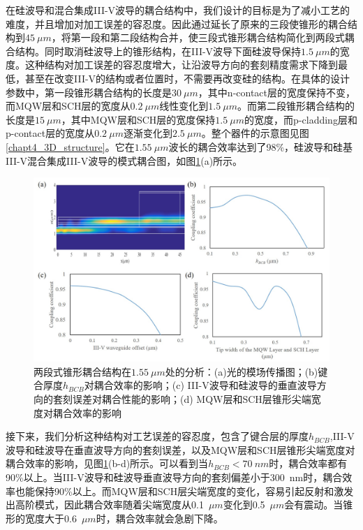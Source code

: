 在硅波导和混合集成III-V波导的耦合结构中，我们设计的目标是为了减小工艺的难度，并且增加对加工误差的容忍度。因此通过延长了原来的三段使锥形的耦合结构到$45~\mu m$，将第一段和第二段结构合并，使三段式锥形耦合结构简化到两段式耦合结构。同时取消硅波导上的锥形结构，在III-V波导下面硅波导保持$1.5~\mu m$的宽度。这种结构对加工误差的容忍度增大，让沿波导方向的套刻精度需求下降到最低，甚至在改变III-V的结构或者位置时，不需要再改变硅的结构。在具体的设计参数中，第一段锥形耦合结构的长度是$30~\mu m$，其中n-contact层的宽度保持不变，而MQW层和SCH层的宽度从$0.2~\mu m$线性变化到$1.5 ~\mu m$。而第二段锥形耦合结构的长度是$15~\mu m$，其中MQW层和SCH层的宽度保持$1.5~\mu m$的宽度，而p-cladding层和p-contact层的宽度从$0.2~\mu m$逐渐变化到$2.5~\mu m$。整个器件的示意图见图\ref{chapt4_3D_structure}。它在$1.55~\mu m$波长的耦合效率达到了98\%，硅波导和硅基III-V混合集成III-V波导的模式耦合图，如图\ref{chapt4_taper_performance}(a)所示。
\begin{figure}[h]
	\centering
	\includegraphics[width=14cm]{./Pictures/chapt4_taper_performance.jpg}
	\caption{两段式锥形耦合结构在$1.55~\mu m$处的分析：(a)光的模场传播图；(b)键合厚度$h_{BCB}$对耦合效率的影响；(c) III-V波导和硅波导的垂直波导方向的套刻误差对耦合性能的影响；(d) MQW层和SCH层锥形尖端宽度对耦合效率的影响}
	\label{chapt4_taper_performance}
\end{figure}

接下来，我们分析这种结构对工艺误差的容忍度，包含了键合层的厚度$h_{BCB}$,III-V波导和硅波导在垂直波导方向的套刻误差，以及MQW层和SCH层锥形尖端宽度对耦合效率的影响，见图\ref{chapt4_taper_performance}(b-d)所示。可以看到当$h_{BCB} < 70 ~nm$时，耦合效率都有90\%以上。当III-V波导和硅波导垂直波导方向的套刻偏差小于300~nm时，耦合效率也能保持90\%以上。而MQW层和SCH层尖端宽度的变化，容易引起反射和激发出高阶模式，因此耦合效率随着尖端宽度从0.1~$\mu m$变化到0.5~$\mu m$会有震动。当锥形的宽度大于0.6~$\mu m$时，耦合效率就会急剧下降。

